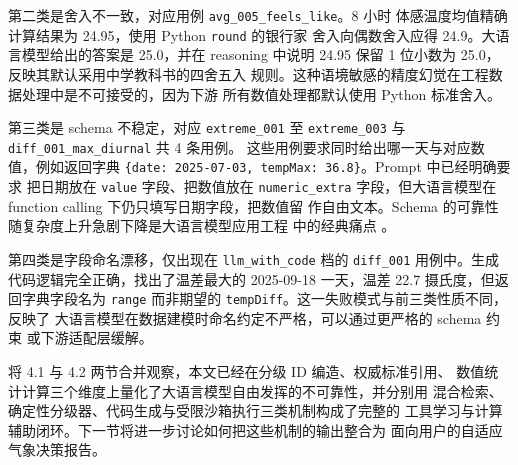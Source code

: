 第二类是舍入不一致，对应用例 \texttt{avg\_\bk{}005\_\bk{}feels\_\bk{}like}。8 小时
体感温度均值精确计算结果为 24.95，使用 Python \texttt{round} 的银行家
舍入向偶数舍入应得 24.9。大语言模型给出的答案是 25.0，并在 reasoning
中说明 24.95 保留 1 位小数为 25.0，反映其默认采用中学教科书的四舍五入
规则。这种语境敏感的精度幻觉在工程数据处理中是不可接受的，因为下游
所有数值处理都默认使用 Python 标准舍入。

第三类是 schema 不稳定，对应 \texttt{extreme\_\bk{}001} 至
\texttt{extreme\_\bk{}003} 与 \texttt{diff\_\bk{}001\_\bk{}max\_\bk{}diurnal} 共 4 条用例。
这些用例要求同时给出哪一天与对应数值，例如返回字典
\texttt{\{date: 2025-07-03, tempMax: 36.8\}}。Prompt 中已经明确要求
把日期放在 \texttt{value} 字段、把数值放在 \texttt{numeric\_\bk{}extra}
字段，但大语言模型在 function calling 下仍只填写日期字段，把数值留
作自由文本。Schema 的可靠性随复杂度上升急剧下降是大语言模型应用工程
中的经典痛点 \cite{ref22}。

第四类是字段命名漂移，仅出现在 \texttt{llm\_\bk{}with\_\bk{}code} 档的
\texttt{diff\_\bk{}001} 用例中。生成代码逻辑完全正确，找出了温差最大的
2025-09-18 一天，温差 22.7 摄氏度，但返回字典字段名为 \texttt{range}
而非期望的 \texttt{tempDiff}。这一失败模式与前三类性质不同，反映了
大语言模型在数据建模时命名约定不严格，可以通过更严格的 schema 约束
或下游适配层缓解。

将 4.1 与 4.2 两节合并观察，本文已经在分级 ID 编造、权威标准引用、
数值统计计算三个维度上量化了大语言模型自由发挥的不可靠性，并分别用
混合检索、确定性分级器、代码生成与受限沙箱执行三类机制构成了完整的
工具学习与计算辅助闭环。下一节将进一步讨论如何把这些机制的输出整合为
面向用户的自适应气象决策报告。

